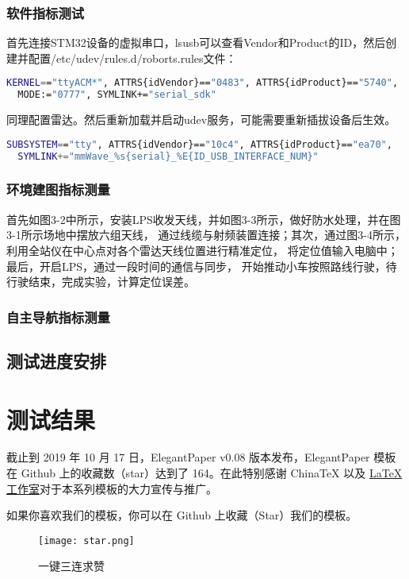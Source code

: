 \documentclass[lang=cn,11pt,a4paper]{elegantpaper}
\begin{document}
\subsubsection{软件指标测试}
首先连接STM32设备的虚拟串口，lsusb可以查看Vendor和Product的ID，然后创建并配置/etc/udev/rules.d/roborts.rules文件：
\begin{lstlisting}[language=bash]
  KERNEL=="ttyACM*", ATTRS{idVendor}=="0483", ATTRS{idProduct}=="5740", 
  MODE:="0777", SYMLINK+="serial_sdk"
\end{lstlisting}
同理配置雷达。然后重新加载并启动udev服务，可能需要重新插拔设备后生效。
\begin{lstlisting}[language=bash]
  SUBSYSTEM=="tty", ATTRS{idVendor}=="10c4", ATTRS{idProduct}=="ea70",
  SYMLINK+="mmWave_%s{serial}_%E{ID_USB_INTERFACE_NUM}"
\end{lstlisting}


\subsubsection{环境建图指标测量}
首先如图3-2中所示，安装LPS收发天线，并如图3-3所示，做好防水处理，并在图3-1所示场地中摆放六组天线，
通过线缆与射频装置连接；其次，通过图3-4所示，利用全站仪在中心点对各个雷达天线位置进行精准定位，
将定位值输入电脑中；最后，开启LPS，通过一段时间的通信与同步，
开始推动小车按照路线行驶，待行驶结束，完成实验，计算定位误差。

\subsubsection{自主导航指标测量}

\subsection{测试进度安排}


\section{测试结果}
截止到 2019 年 10 月 17 日，ElegantPaper v0.08 版本发布，ElegantPaper 模板在 Github 上的收藏数（star）达到了 164。在此特别感谢 China\TeX{} 以及 \href{http://www.latexstudio.net/}{\LaTeX{} 工作室}对于本系列模板的大力宣传与推广。

如果你喜欢我们的模板，你可以在 Github 上收藏（Star）我们的模板。
\begin{figure}[htbp]
  \centering
  \texttt{[image: star.png]}
  \caption{一键三连求赞}
\end{figure}
\end{document}
